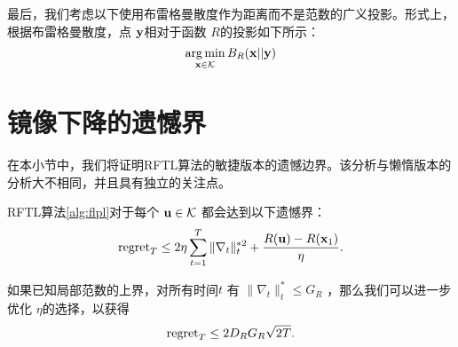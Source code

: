 最后，我们考虑以下使用布雷格曼散度作为距离而不是范数的广义投影。形式上，根据布雷格曼散度，点 $\mathbf y$相对于函数 $R$的投影如下所示：
$$\operatorname*{\arg\min}_{\mathbf x \in \mathcal K} B_{R}(\mathbf x||\mathbf y)$$



\section{
	镜像下降的遗憾界
	}


在本小节中，我们将证明RFTL算法的敏捷版本的遗憾边界。该分析与懒惰版本的分析大不相同，并且具有独立的关注点。

\begin{theorem}[定理] \label{thm:mirrordescent}
RFTL算法\ref{alg:flpl}对于每个 $\mathbf u \in \mathcal K$ 都会达到以下遗憾界：
$$  \mathrm{{regret}}_T \le    2   \eta  \sum_{t=1}^T \| \nabla_t \|_t^{* 2} + \frac{R(\mathbf u) - R(\mathbf x_1)}{\eta }  . $$ %
\end{theorem}
如果已知局部范数的上界，对所有时间$t$ 有 $\| \nabla_t\|_t^* \leq G_R$ ，那么我们可以进一步优化 $\eta$的选择，以获得
$$ \mathrm{{regret}}_T \leq  2  D_R G_R \sqrt{ 2T  } .$$

